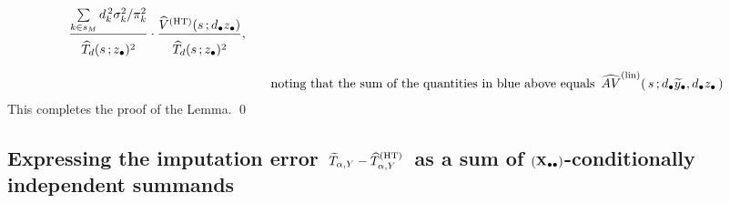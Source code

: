 \begin{enumerate}
\begin{eqnarray*}
        \dfrac{
            \underset{k \in s_{M}}{\sum}\,d_{k}^{\,2}\sigma^{2}_{k}/\pi_{k}^{2}
            }{
            \overset{{\color{white}.}}{
                \widehat{T}_{d}(s\,;\zdot)^{2}
                }
            }
        \cdot
        \dfrac{
            \widehat{V}^{\textnormal{(HT)}}(s\,;\dbullet\zdot)
            }{
            \overset{{\color{white}.}}{
                \widehat{T}_{d}(s\,;\zdot)^{2}
                }
            },
    \\
    &&
        \quad
        \overset{{\color{white}1}}{
            \textnormal{noting that
                the sum of the quantities in blue above equals
                \,$\widehat{AV}^{\textnormal{(lin)}}(\,s\,;\dbullet\widetilde{y}_{\bullet},\dbullet\zdot\,)$
                }
            }
    \end{eqnarray*}
    This completes the proof of the Lemma.
    \vskip -0.5cm
    \qed
\end{enumerate}


\clearpage
\subsection{Expressing the imputation error
\,$\widetilde{T}_{\alpha,Y} - \widehat{T}^{\textnormal{(HT)}}_{\alpha,Y}$\,
as a sum of $(\mathbf{X}_{\bullet\bullet})$-conditionally independent summands}
\setcounter{theorem}{0}


